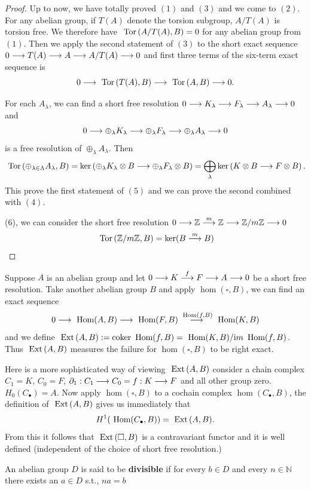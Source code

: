 \documentclass[11pt]{book} %
\begin{document}
\begin{proof}
Up to now, we have totally proved $(1)$ and $(3)$ and we come to $(2)$. For any abelian group, if $T(A)$ denote the torsion subgroup, $A/T(A)$ is torsion free. We therefore have $\text{ Tor\,}(A/T(A), B)=0$ for any abelian group from $(1)$. Then we apply the second statement of $(3)$  to the short exact sequence $0\longrightarrow T(A)\longrightarrow A\longrightarrow A/T(A)\longrightarrow 0$ and first three terms of the six-term exact sequence is
$$
0\longrightarrow \text{ Tor\,}(T(A),B)\longrightarrow\text{ Tor\,}(A,B)\longrightarrow 0.
$$

For each $A_\lambda$, we can find a short free resolution $0\longrightarrow K_\lambda\longrightarrow F_\lambda\longrightarrow A_\lambda\longrightarrow 0$ and 
$$
0\longrightarrow \oplus_\lambda K_\lambda\longrightarrow \oplus_\lambda F_\lambda\longrightarrow \oplus_\lambda A_\lambda\longrightarrow 0
$$ is a free resolution of $\oplus_\lambda A_\lambda$. Then
$$
\text{ Tor\,}(\oplus_{\lambda\in \Lambda} A_\lambda, B)=\ker\left(\oplus_\lambda K_\lambda\otimes B\longrightarrow \oplus_\lambda F_\lambda\otimes B\right)=\bigoplus_\lambda\ker\left(K\otimes B\longrightarrow F\otimes B\right).
$$
This prove the first statement of $(5)$ and we can prove the second combined with $(4)$.

(6), we can consider the short free resolution $0\longrightarrow \mathbb Z\overset{m}{\longrightarrow}\mathbb Z\longrightarrow \mathbb Z/m\mathbb Z\longrightarrow 0$ 
$$
\text{ Tor\,}(\mathbb Z/m\mathbb Z, B)=\ker(B\overset{m}{\longrightarrow} B)
$$

\end{proof}

\begin{definition}
Suppose $A$ is an abelian group and let 
$
0\longrightarrow K \overset{f}{\longrightarrow} F\longrightarrow A\longrightarrow 0
$
be a short free resolution. Take another abelian group $B$ and apply $\hom(\square, B)$, we can find an exact sequence
$$
0\longrightarrow \text{ Hom}(A, B)\longrightarrow \text{ Hom}(F,B) \overset{\text{ Hom}(f,B)}{\longrightarrow} \text{ Hom}(K,B)
$$
and we define $\text{ Ext\,}(A,B):=\text{coker\,}\text{ Hom}(f,B)=\text{ Hom} (K,B)/{\text im\thinspace} \text{ Hom}(f,B)$. Thus $\text{ Ext\,} (A,B) $ measures the failure for $\hom(\square, B)$ to be right exact.
\end{definition}
Here is a more sophisticated way of viewing $\text{ Ext\,} (A,B)$ consider a chain complex $C_1=K$, $C_0=F$, ${\partial}_1:C_1\longrightarrow C_0=f: K\longrightarrow F$ and all other group zero. $H_0(C_\bullet)=A$. Now apply $\hom(\square, B)$ to a cochain complex $\hom(C_\bullet ,B)$, the definition of $\text{ Ext\,} (A,B)$ gives us immediately that
$$
H^1(\text{ Hom}(C_\bullet,B))=\text{ Ext\,}(A,B).
$$
From this it follows that $\text{ Ext\,}(\square, B)$ is a contravariant functor and it is well defined (independent of the choice of short free resolution.)
\begin{definition}
An abelian group $D$ is said to be \textbf{divisible} if  for every $b\in D$ and every $n\in \mathbb{N}$ there exists an $a\in D$ s.t., $na=b$
\end{definition}
\end{document}
